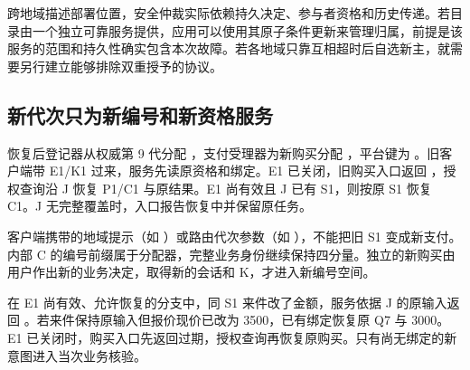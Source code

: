跨地域描述部署位置，安全仲裁实际依赖持久决定、参与者资格和历史传递。若目录由一个独立可靠服务提供，应用可以使用其原子条件更新来管理归属，前提是该服务的范围和持久性确实包含本次故障。若各地域只靠互相超时后自选新主，就需要另行建立能够排除双重授予的协议。

\subsection*{新代次只为新编号和新资格服务}

恢复后登记器从权威第 9 代分配 ，支付受理器为新购买分配 ，平台键为 。旧客户端带 E1/K1 过来，服务先读原资格和绑定。E1 已关闭，旧购买入口返回 ，授权查询沿 J 恢复 P1/C1 与原结果。E1 尚有效且 J 已有 S1，则按原 S1 恢复 C1。J 无完整覆盖时，入口报告恢复中并保留原任务。

客户端携带的地域提示（如 ）或路由代次参数（如 ），不能把旧 S1 变成新支付。内部 C 的编号前缀属于分配器，完整业务身份继续保持四分量。独立的新购买由用户作出新的业务决定，取得新的会话和 K，才进入新编号空间。

在 E1 尚有效、允许恢复的分支中，同 S1 来件改了金额，服务依据 J 的原输入返回 。若来件保持原输入但报价现价已改为 3500，已有绑定恢复原 Q7 与 3000。E1 已关闭时，购买入口先返回过期，授权查询再恢复原购买。只有尚无绑定的新意图进入当次业务核验。
\FloatBarrier
